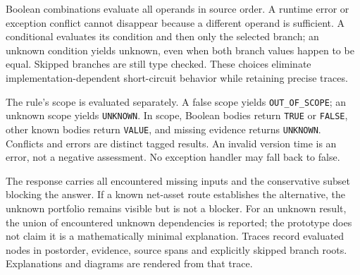Boolean combinations evaluate all operands in source order. A runtime error or
exception conflict cannot disappear because a different operand is sufficient.
A conditional evaluates its condition and then only the selected branch; an
unknown condition yields unknown, even when both branch values happen to be
equal. Skipped branches are still type checked. These choices eliminate
implementation-dependent short-circuit behavior while retaining precise traces.

The rule's scope is evaluated separately. A false scope yields
\texttt{OUT\_OF\_SCOPE}; an unknown scope yields \texttt{UNKNOWN}. In scope,
Boolean bodies return \texttt{TRUE} or \texttt{FALSE}, other known bodies return
\texttt{VALUE}, and missing evidence returns \texttt{UNKNOWN}. Conflicts and
errors are distinct tagged results. An invalid version time is an error, not a
negative assessment. No exception handler may fall back to false.

The response carries all encountered missing inputs and the conservative subset
blocking the answer. If a known net-asset route establishes the alternative,
the unknown portfolio remains visible but is not a blocker. For an unknown
result, the union of encountered unknown dependencies is reported; the prototype
does not claim it is a mathematically minimal explanation. Traces record evaluated
nodes in postorder, evidence, source spans and explicitly skipped branch roots.
Explanations and diagrams are rendered from that trace.
